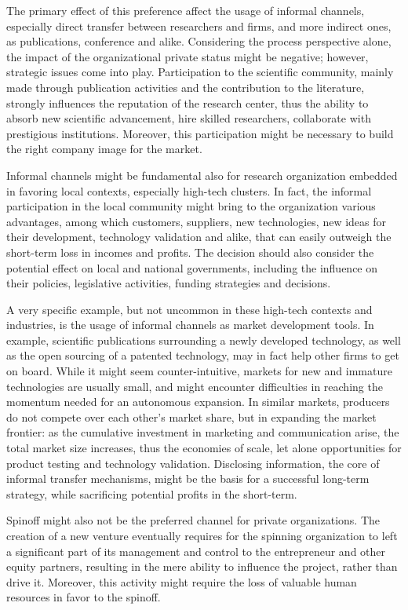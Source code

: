 The primary effect of this preference affect the usage of informal channels, especially direct transfer between researchers and firms, and more indirect ones, as publications, conference and alike. Considering the process perspective alone, the impact of the organizational private status might be negative; however, strategic issues come into play. Participation to the scientific community, mainly made through publication activities and the contribution to the literature, strongly influences the reputation of the research center, thus the ability to absorb new scientific advancement, hire skilled researchers, collaborate with prestigious institutions. Moreover, this participation might be necessary to build the right company image for the market.

Informal channels might be fundamental also for research organization embedded in favoring local contexts, especially high-tech clusters. In fact, the informal participation in the local community might bring to the organization various advantages, among which customers, suppliers, new technologies, new ideas for their development, technology validation and alike, that can easily outweigh the short-term loss in incomes and profits. The decision should also consider the potential effect on local and national governments, including the influence on their policies, legislative activities, funding strategies and decisions. 

A very specific example, but not uncommon in these high-tech contexts and industries, is the usage of informal channels as market development tools. In example, scientific publications surrounding a newly developed technology, as well as the open sourcing of a patented technology, may in fact help other firms to get on board. While it might seem counter-intuitive, markets for new and immature technologies are usually small, and might encounter difficulties in reaching the momentum needed for an autonomous expansion. In similar markets, producers do not compete over each other's market share, but in expanding the market frontier: as the cumulative investment in marketing and communication arise, the total market size increases, thus the economies of scale, let alone opportunities for product testing and technology validation. Disclosing information, the core of informal transfer mechanisms, might be the basis for a successful long-term strategy, while sacrificing potential profits in the short-term.

Spinoff might also not be the preferred channel for private organizations. The creation of a new venture eventually requires for the spinning organization to left a significant part of its management and control to the entrepreneur and other equity partners, resulting in the mere ability to influence the project, rather than drive it. Moreover, this activity might require the loss of valuable human resources in favor to the spinoff. 


